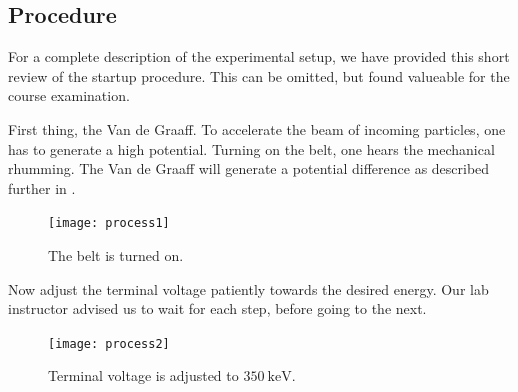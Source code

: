 %
\clearpage
\subsection{Procedure}\label{sec_procedure}
For a complete description of the experimental setup, we have provided this
short review of the startup procedure. This can be omitted, but found valueable
for the course examination.

First thing, the Van de Graaff. To accelerate the beam of incoming particles,
one has to generate a high potential. Turning on the belt, one hears the
mechanical rhumming. The Van de Graaff will generate a potential difference as described
further in \cite[p. 565]{krane}.
\begin{figure}[h!]
\centering
\texttt{[image: process1]}
\caption{The belt is turned on.}
\label{fig_process1}
\end{figure}

Now adjust the terminal voltage patiently towards the desired energy. Our lab
instructor advised us to wait for each step, before going to the next.
\begin{figure}[h!]
\centering
\texttt{[image: process2]}
\caption{Terminal voltage is adjusted to $\SI{350}{\kilo\electronvolt}$.}
\label{fig_process2}
\end{figure}

